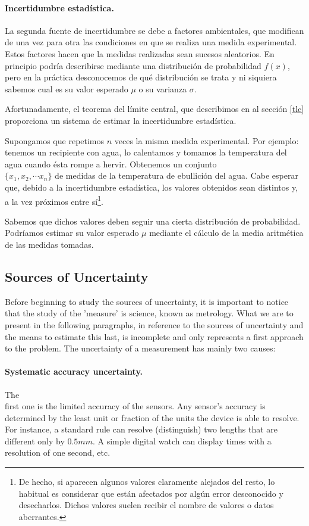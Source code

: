 \begin{paracol}{2}
\paragraph{Incertidumbre estadística.} La segunda fuente de incertidumbre se debe a factores ambientales, que modifican de una vez para otra las condiciones en que se realiza una medida experimental. Estos factores hacen que la medidas realizadas sean sucesos aleatorios. En principio podría describirse mediante una distribución de probabilidad $f(x)$, pero en la práctica desconocemos de qué distribución se trata y ni siquiera sabemos cual es su valor esperado $\mu$ o su varianza $\sigma$. 

Afortunadamente, el teorema del límite central, que describimos en al sección \ref{tlc} proporciona un sistema de estimar la incertidumbre estadística.

Supongamos que repetimos $n$ veces la misma medida experimental. Por ejemplo: tenemos un recipiente con agua, lo calentamos y tomamos la temperatura del agua cuando ésta rompe a hervir. Obtenemos un conjunto\\ $\{x_1,x_2,\cdots x_n \}$ de medidas de la temperatura de ebullición del agua. Cabe esperar que, debido a la incertidumbre estadística, los valores obtenidos sean distintos  y, a la vez próximos entre sí\footnote{De hecho, si aparecen algunos valores claramente alejados del resto, lo habitual es considerar que están afectados por algún error desconocido y desecharlos. Dichos valores suelen recibir el nombre de valores o datos aberrantes.}.

Sabemos que dichos valores deben seguir una cierta distribución de probabilidad. Podría\-mos estimar su valor esperado $\mu$ mediante el cálculo de la media aritmética de las medidas tomadas.
\switchcolumn
\subsection{Sources of Uncertainty}\label{fdii}
Before beginning to study the sources of uncertainty, it is important to notice that the study of the 'measure' is science, known as metrology. What we are to present in the following paragraphs, in reference to the sources of uncertainty and the means to estimate this last, is incomplete and only represents a first approach to the problem. The uncertainty of a measurement has mainly two causes:

\paragraph{Systematic accuracy uncertainty.}
The\\ first one is the limited accuracy of the sensors. Any sensor's accuracy is determined by the least unit or fraction of the units the device is able to resolve. For instance, a standard rule can resolve (distinguish) two lengths that are different only by $0.5mm$. A simple digital watch can display times with a resolution of one second, etc.


\end{paracol}
